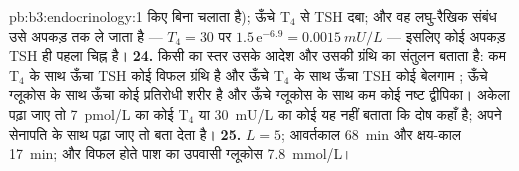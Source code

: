 \begin{solution}{pb:b3:endocrinology:1}
किए बिना चलाता है); ऊँचे T$_{4}$ से TSH दबा; और वह लघु-रैखिक संबंध उसे
अपकड़ तक ले जाता है --- $T_{4} = 30$ पर $1.5\,\mathrm{e}^{-6.9}
= \qty{0.0015}{mU/L}$ --- इसलिए कोई अपकड़ TSH ही पहला चिह्न है।
\textbf{24.} किसी  का स्तर उसके आदेश और उसकी ग्रंथि का संतुलन
बताता है: कम T$_{4}$ के साथ ऊँचा TSH कोई विफल ग्रंथि है और ऊँचे
T$_{4}$ के साथ ऊँचा TSH कोई बेलगाम ; ऊँचे ग्लूकोस के साथ ऊँचा
 कोई प्रतिरोधी शरीर है और ऊँचे ग्लूकोस के साथ कम  कोई
नष्ट द्वीपिका। अकेला पढ़ा जाए तो \qty{7}{pmol/L} का कोई T$_{4}$ या
\qty{30}{mU/L} का कोई  यह नहीं बताता कि दोष कहाँ है; अपने
सेनापति के साथ पढ़ा जाए तो बता देता है।
\textbf{25.}  $L = 5$; आवर्तकाल \qty{68}{min} और क्षय-काल
\qty{17}{min}; और विफल होते पाश का उपवासी ग्लूकोस \qty{7.8}{mmol/L}।
\end{solution}
